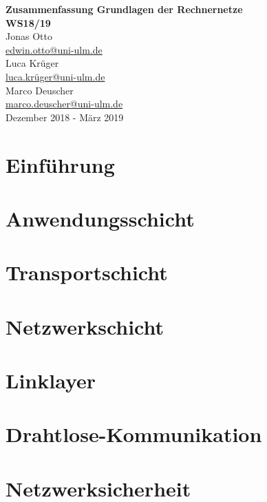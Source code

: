 \documentclass[a4paper]{report}
\begin{document}
\begin{titlepage}
    \centering
    \vfill
    \vfill
    {\bfseries\Large
        Zusammenfassung Grundlagen der Rechnernetze\\
        WS18/19\\
    }    
    \vskip2cm
        Jonas Otto\\ \href{mailto:edwin.otto@uni-ulm.de}{edwin.otto@uni-ulm.de}\\
        Luca Krüger\\ \href{luca.krüger@uni-ulm.de}{luca.krüger@uni-ulm.de}\\
        Marco Deuscher\\ \href{marco.deuscher@uni-ulm.de}{marco.deuscher@uni-ulm.de}\\
        \vfill
     Dezember 2018 - März 2019
    \vfill
    \vfill
    \vfill
\end{titlepage}

\clearpage


\newpage

\tableofcontents
\newpage

\chapter{Einführung}


\chapter{Anwendungsschicht}


\chapter{Transportschicht}


\chapter{Netzwerkschicht}


\chapter{Linklayer}


\chapter{Drahtlose-Kommunikation}


\chapter{Netzwerksicherheit}

\end{document}
